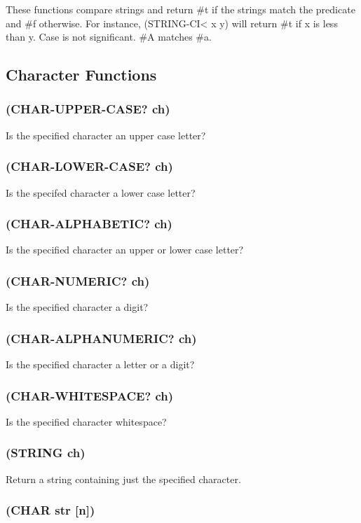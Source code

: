 \documentclass[11pt]{article}
\begin{document}
These functions compare strings and return \#t if the strings match
the predicate and \#f otherwise.  For instance, (STRING-CI< x y) will
return \#t if x is less than y.  Case is not significant.  \#A
matches \#a.
\subsection{Character Functions}
\label{sec-4-30}

\subsubsection{(CHAR-UPPER-CASE? ch)}
\label{sec-4-30-1}

Is the specified character an upper case letter?
\subsubsection{(CHAR-LOWER-CASE? ch)}
\label{sec-4-30-2}

Is the specifed character a lower case letter?
\subsubsection{(CHAR-ALPHABETIC? ch)}
\label{sec-4-30-3}

Is the specified character an upper or lower case letter?
\subsubsection{(CHAR-NUMERIC? ch)}
\label{sec-4-30-4}

Is the specified character a digit?
\subsubsection{(CHAR-ALPHANUMERIC? ch)}
\label{sec-4-30-5}

Is the specified character a letter or a digit?
\subsubsection{(CHAR-WHITESPACE? ch)}
\label{sec-4-30-6}

Is the specified character whitespace?
\subsubsection{(STRING ch)}
\label{sec-4-30-7}

Return a string containing just the specified character.
\subsubsection{(CHAR str [n])}
\label{sec-4-30-8}
\end{document}
